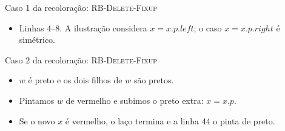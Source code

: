 \documentclass[aspectratio=169,10pt]{beamer}
\newcommand{\proc}[1]{\textnormal{\rmfamily\textsc{#1}}}
\newcommand{\at}[1]{.\mathit{#1}}
\begin{document}
\begin{frame}{Caso 1 da recoloração: \proc{RB-Delete-Fixup}}
  \vspace{2mm}
  \begin{itemize}
    \item Linhas 4--8. A ilustração considera $x = x\at{p}\at{left}$; o caso $x = x\at{p}\at{right}$ é simétrico.
  \end{itemize}
\end{frame}

\begin{frame}{Caso 2 da recoloração: \proc{RB-Delete-Fixup}}
  \begin{itemize}
    \item $w$ é \alert{preto} e os \alert{dois filhos} de $w$ são \alert{pretos}.
    \item Pintamos $w$ de vermelho e subimos o preto extra: $x = x\at{p}$.
    \item Se o novo $x$ é vermelho, o laço termina e a linha 44 o pinta de preto.
  \end{itemize}


\end{frame}
\end{document}
